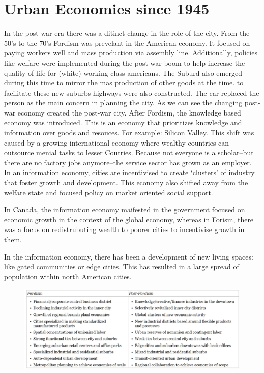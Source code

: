 \documentclass[12pt]{book}
\begin{document}
\section*{Urban Economies since 1945}
In the post-war era there was a ditinct change in the role of the city.
From the 50's to the 70's Fordism was prevelant in the American economy. It focused on paying workers well and 
mass production via assembly line. Additionally, policies like welfare were implemented during the post-war boom
to help increase the quality of life for (white) working class americans. The Suburd also emerged during this 
time to mirror the mas production of other goods at the time. to facilitate these new suburbs highways were
also constructed. The car replaced the person as the main concern in planning the city. As we can see the changing
post-war economy created the post-war city.
After Fordism, the knowledge based economy was introduced. This is an economy that prioritizes knowledge and information
over goods and resouces. For example: Silicon Valley. This shift was caused by a growing international economy where
wealthy countries can outsource menial tasks to lesser Coutries.
Because not everyone is a scholar--but there are no factory jobs anymore--the service sector has grown as an employer.
In an information economy, cities are incentivised to create `clusters' of industry that foster growth and development.
This economy also shifted away from the welfare state and focused policy on market oriented social support.

In Canada, the information economy maifested in the government focused on economic growth in the context of the global
economy, whereas in Forism, there was a focus on redistrubuting wealth to poorer cities to incentivise growth in them.

In the information economy, there has been a development of new living spaces: like gated communities or edge cities.
This has resulted in a large spread of population within north American cities.
\begin{figure}[h]
        \centering
        \includegraphics[scale = 0.5]{./figures/postford}
\end{figure}
\pagebreak
\end{document}
